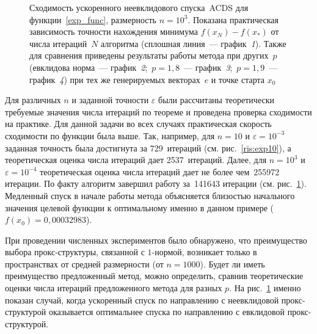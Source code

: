 \documentclass[11pt]{article}
\begin{document}
\begin{figure}[htb]
			\caption{Сходимость ускоренного неевклидового спуска~ACDS для 
функции~\eqref{exp_func}, размерность $n = 10^3$. Показана практическая зависимость точности нахождения минимума $f(x_N)- f(x_*)$ от числа итераций~$N$ алгоритма (сплошная линия~---
график~{\it 1}). Также для сравнения приведены
результаты работы метода
при других~$p$ (евклидова норма~--- график~{\it 2}; $\, p=1,8$~--- график~{\it 3}; $\, p=1,9$~--- график~{\it 4}) при тех же генерируемых векторах~$e$ и точке старта $x_0$}
			\label{ris:exp1000}
		\end{figure}
	

	
Для различных $n$ и заданной точности $\varepsilon$
были рассчитаны теоретически требуемые значения числа итераций
по теореме и проведена проверка сходимости на практике. Для данной задачи во всех случаях практическая
скорость сходимости по функции была выше.
Так, например, для $n = 10$ и $\varepsilon = 10^{-3}$
заданная точность была достигнута 
за 729~итераций (см. рис.~\ref{ris:exp10}), а теоретическая оценка
числа итераций дает  2537~итераций. 
Далее, для $n = 10^3$ и $\varepsilon = 10^{-4}$ 
теоретическая оценка
числа итераций дает не более чем~255972 итерации.
По факту алгоритм завершил работу
за~141643 итерации
(см. рис.~\ref{ris:exp1000}). 
Медленный спуск в начале
работы метода объясняется близостью начального
значения целевой функции к оптимальному именно
в данном примере ($f(x_0) = 0,00032983$). 

При проведении численных экспериментов
было обнаружено, что преимущество выбора прокс-структуры, связанной с $1$-нормой, возникает только
в пространствах от средней размерности (от $n=1000$). Будет ли иметь преимущество
предложенный метод, можно определить, сравнив
теоретические
оценки числа итераций предложенного метода
для разных $p$. На рис.~\ref{ris:exp1000} именно показан случай,
когда ускоренный спуск по направлению с неевклидовой прокс-структурой оказывается оптимальнее
спуска по направлению с евклидовой прокс-структурой.
\end{document}
